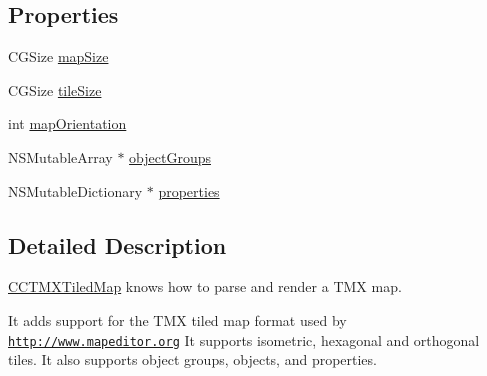 \subsection*{Properties}
\begin{DoxyCompactItemize}
\item 
C\-G\-Size \hyperlink{interface_c_c_t_m_x_tiled_map_a2dcb62f1acc4639fc7ba2e8045e53113}{map\-Size}
\item 
C\-G\-Size \hyperlink{interface_c_c_t_m_x_tiled_map_abc2a131730260e673fbe8ff51fde6490}{tile\-Size}
\item 
int \hyperlink{interface_c_c_t_m_x_tiled_map_a68fcccfad8cdc9997041c92e601dff76}{map\-Orientation}
\item 
N\-S\-Mutable\-Array $\ast$ \hyperlink{interface_c_c_t_m_x_tiled_map_a0e4d5c1ec0940e6bc4dcc7a253af8da5}{object\-Groups}
\item 
N\-S\-Mutable\-Dictionary $\ast$ \hyperlink{interface_c_c_t_m_x_tiled_map_a33c0dc23ec83c6e5c8f6183993ebd59c}{properties}
\end{DoxyCompactItemize}


\subsection{Detailed Description}
\hyperlink{interface_c_c_t_m_x_tiled_map}{C\-C\-T\-M\-X\-Tiled\-Map} knows how to parse and render a T\-M\-X map.

It adds support for the T\-M\-X tiled map format used by \href{http://www.mapeditor.org}{\tt http\-://www.\-mapeditor.\-org} It supports isometric, hexagonal and orthogonal tiles. It also supports object groups, objects, and properties.

